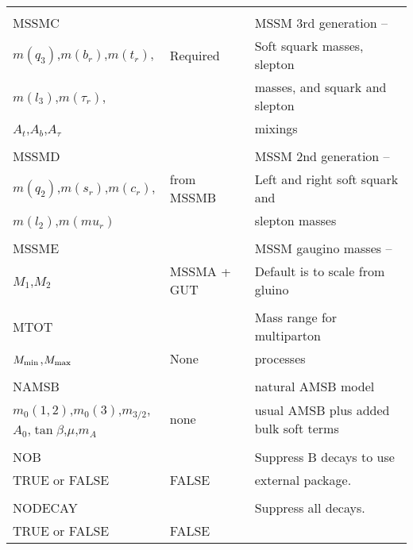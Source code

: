 \begin{center}
\begin{tabular}{lll}
                       &                   &                                \\
MSSMC                  &                   & MSSM 3rd generation --         \\
$m(q_3)$,$m(b_r)$,$m(t_r)$,  & Required    & Soft squark masses, slepton    \\
$m(l_3)$,$m(\tau_r)$,  &                   & masses, and squark and slepton \\
$A_t$,$A_b$,$A_\tau$   &                   & mixings                        \\
                       &                   &                                \\
MSSMD                  &                   & MSSM 2nd generation --         \\
$m(q_2)$,$m(s_r)$,$m(c_r)$,  & from MSSMB  & Left and right soft squark and \\
$m(l_2)$,$m(mu_r)$     &                   & slepton masses                 \\
                       &                   &                                \\
MSSME                  &                   & MSSM gaugino masses --         \\
$M_1$,$M_2$            & MSSMA + GUT       & Default is to scale from gluino\\
                       &                   &                                \\
MTOT                   &                   & Mass range for multiparton     \\
$M_{\rm min}$,$M_{\rm max}$ & None         & processes                      \\
                       &                   &                                \\
NAMSB                  &                   & natural AMSB model            \\
$m_0(1,2)$,$m_0(3)$,$m_{3/2}$,$A_0$,$\tan\beta$,$\mu$,$m_A$ & none & usual AMSB
plus added bulk soft terms \\
                       &                   &                                \\
NOB                    &                   & Suppress B decays to use       \\
TRUE or FALSE          & FALSE             & external package.              \\
                       &                   &                                \\
NODECAY                &                   & Suppress all decays.           \\
TRUE or FALSE          & FALSE             &                                \\
\hline\hline
\end{tabular}
\end{center}

